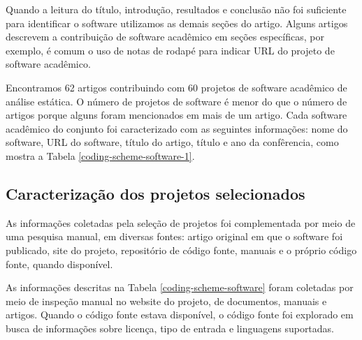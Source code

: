 Quando a leitura do título, introdução, resultados e conclusão não foi suficiente
para identificar o software utilizamos as demais seções do artigo. Alguns
artigos descrevem a contribuição de software acadêmico em seções específicas,
por exemplo, é comum o uso de notas de rodapé para indicar URL do projeto de
software acadêmico.

Encontramos 62 artigos contribuindo com 60 projetos de software acadêmico de
análise estática. O número de projetos de software é menor do que o número
de artigos porque alguns foram mencionados em mais de um artigo. 
Cada software acadêmico do conjunto foi caracterizado com
as seguintes informações: nome do software, URL do software, título do
artigo, título e ano da confêrencia, como mostra a  Tabela \ref{coding-scheme-software-1}.

\subsection{Caracterização dos projetos selecionados}

As informações coletadas pela seleção de projetos foi complementada por meio de
uma pesquisa manual, em diversas fontes: 
artigo original em que o software foi publicado, site do projeto,
repositório de código fonte, manuais e o próprio código fonte, quando disponível.

As informações descritas na Tabela \ref{coding-scheme-software} foram coletadas 
por meio de inspeção manual no website do projeto, de documentos, manuais e artigos.
Quando o código fonte estava disponível, o código fonte foi explorado em busca de 
informações sobre licença, tipo de entrada e linguagens suportadas.

